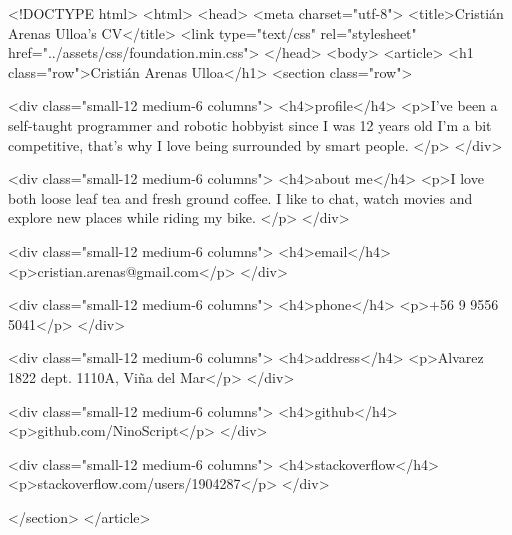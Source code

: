 
<!DOCTYPE html>
<html>
<head>
    <meta charset="utf-8">
    <title>Cristián Arenas Ulloa's CV</title>
    <link type="text/css" rel="stylesheet" href="../assets/css/foundation.min.css">
</head>
<body>
    <article>
        <h1 class="row">Cristián Arenas Ulloa</h1>
        <section class="row">
            
            <div class="small-12 medium-6 columns">
                <h4>profile</h4>
                <p>I’ve been a self-taught programmer and robotic hobbyist since I was 12 years old
I’m a bit competitive, that’s why I love being surrounded by smart people.
</p>
            </div>
            
            <div class="small-12 medium-6 columns">
                <h4>about me</h4>
                <p>I love both loose leaf tea and fresh ground coffee.
I like to chat, watch movies and explore new places while riding my bike.
</p>
            </div>
            
            <div class="small-12 medium-6 columns">
                <h4>email</h4>
                <p>cristian.arenas@gmail.com</p>
            </div>
            
            <div class="small-12 medium-6 columns">
                <h4>phone</h4>
                <p>+56 9 9556 5041</p>
            </div>
            
            <div class="small-12 medium-6 columns">
                <h4>address</h4>
                <p>Alvarez 1822 dept. 1110A, Viña del Mar</p>
            </div>
            
            <div class="small-12 medium-6 columns">
                <h4>github</h4>
                <p>github.com/NinoScript</p>
            </div>
            
            <div class="small-12 medium-6 columns">
                <h4>stackoverflow</h4>
                <p>stackoverflow.com/users/1904287</p>
            </div>
            
        </section>
    </article>
    
